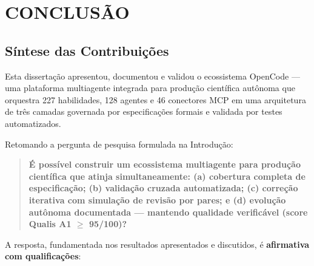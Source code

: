 
\chapter{CONCLUSÃO}
\label{ch:conclusao}

\section{Síntese das Contribuições}

Esta dissertação apresentou, documentou e validou o ecossistema OpenCode --- uma plataforma multiagente integrada para produção científica autônoma que orquestra 227 habilidades, 128 agentes e 46 conectores MCP em uma arquitetura de três camadas governada por especificações formais e validada por testes automatizados.

Retomando a pergunta de pesquisa formulada na Introdução:

\begin{quote}
  \textbf{É possível construir um ecossistema multiagente para produção científica que atinja simultaneamente: (a) cobertura completa de especificação; (b) validação cruzada automatizada; (c) correção iterativa com simulação de revisão por pares; e (d) evolução autônoma documentada --- mantendo qualidade verificável (score Qualis A1 $\geq$ 95/100)?}
\end{quote}

A resposta, fundamentada nos resultados apresentados e discutidos, é \textbf{afirmativa com qualificações}:

